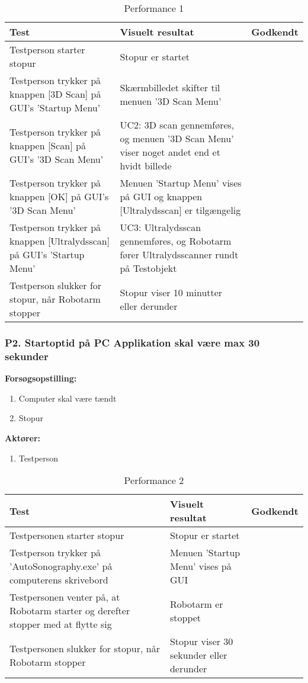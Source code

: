 \begin{table}[htb]
\begin{tabularx}{\textwidth}{|X|X|p{2cm}|}
\hline
\textbf{Test} & \textbf{Visuelt resultat} &\textbf{Godkendt}\\\hline  
Testperson starter stopur & Stopur er startet & \\\hline
Testperson trykker på knappen [3D Scan] på GUI's 'Startup Menu' & Skærmbilledet skifter til menuen '3D Scan Menu' &  \\\hline
Testperson trykker på knappen [Scan] på GUI's '3D Scan Menu' & UC2: 3D scan gennemføres, og menuen '3D Scan Menu' viser noget andet end et hvidt billede & \\\hline
Testperson trykker på knappen [OK] på GUI's '3D Scan Menu' & Menuen 'Startup Menu' vises på GUI og knappen [Ultralydsscan] er tilgængelig & \\\hline
Testperson trykker på knappen [Ultralydsscan] på GUI's 'Startup Menu' & UC3: Ultralydsscan gennemføres, og Robotarm fører Ultralydsscanner rundt på Testobjekt & \\\hline
Testperson slukker for stopur, når Robotarm stopper & Stopur viser 10 minutter eller derunder & \\\hline
\end{tabularx} 
\caption{Performance 1}
\label{P1}
\end{table}
\newpage

\subsubsection{P2. Startoptid på PC Applikation skal være max 30 sekunder}
\textbf{Forsøgsopstilling:}
\begin{enumerate}
\item Computer skal være tændt
\item Stopur
\end{enumerate}
\textbf{Aktører:}
\begin{enumerate}
\item Testperson
\end{enumerate}

\begin{table}[htb]
\begin{tabularx}{\textwidth}{|X|X|p{2cm}|}
\hline
\textbf{Test} & \textbf{Visuelt resultat} &\textbf{Godkendt}\\\hline  
Testpersonen starter stopur & Stopur er startet & \\ \hline
Testperson trykker på 'AutoSonography.exe' på computerens skrivebord & Menuen 'Startup Menu' vises på GUI &\\\hline
Testpersonen venter på, at Robotarm starter og derefter stopper med at flytte sig & Robotarm er stoppet  & \\\hline
Testpersonen slukker for stopur, når Robotarm stopper & Stopur viser 30 sekunder eller derunder & \\ \hline
\end{tabularx} 
\caption{Performance 2}
\label{P2}
\end{table}
\newpage

